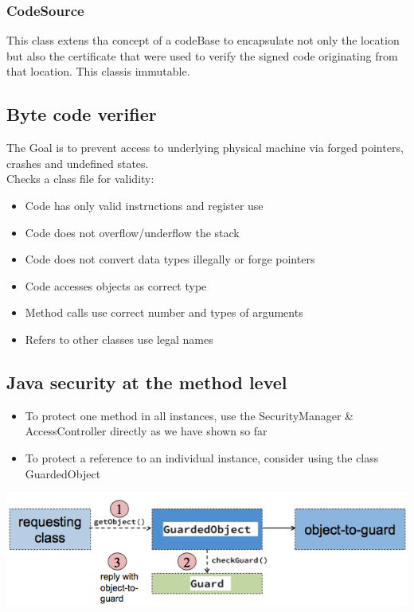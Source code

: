 \documentclass[10pt]{article}
\begin{document}
\subsubsection{CodeSource}
This class extens tha concept of a codeBase to encapsulate not only the location but also the certificate that were used to verify the signed code originating from that location. This classis immutable. 

\subsection{Byte code verifier}
The Goal is to prevent access to underlying physical machine via forged pointers, crashes and undefined states. \\
Checks a class file for validity:
\begin{itemize}
	\item Code has only valid instructions and register use
	\item Code does not overflow/underflow the stack
	\item Code does not convert data types illegally or forge pointers
	\item Code accesses objects as correct type
	\item Method calls use correct number and types of arguments
	\item Refers to other classes use legal names
\end{itemize}

\subsection{Java security at the method level}
\begin{itemize}
	\item To protect one method in all instances, use the SecurityManager & AccessController directly as we have shown so far
	\item To protect a reference to an individual instance, consider using  the class GuardedObject
\end{itemize}
\begin{center}
	\includegraphics[scale=0.3]{guardedObject.png}
\end{center}
\end{document}
